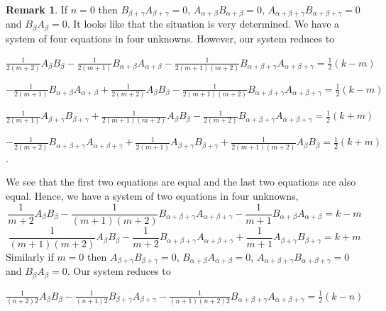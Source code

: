 \documentclass[twoside,a4paper,12pt]{article}
\theoremstyle{definition}
\newtheorem{remark}{Remark}
\newcommand{\ds}{\displaystyle}
\begin{document}
\begin{remark}\label{4to2}
	If $n=0$ then $B_{\beta+\gamma}A_{\beta+\gamma}=0$,
	$A_{\alpha+\beta}B_{\alpha+\beta}=0$,
	$A_{\alpha+\beta+\gamma}B_{\alpha+\beta+\gamma}=0$ and $B_\beta A_\beta=0$.
	It looks like that the situation is very determined. We have a system of
	four equations in four unknowns. However, our system reduces to
	\begin{flushleft}
		$\ds \frac1{2(m+2)}A_\beta B_\beta
		-\frac1{2(m+1)}B_{\alpha+\beta}A_{\alpha+\beta}-
		\frac1{2(m+1)(m+2)}
		B_{\alpha+\beta+\gamma}A_{\alpha+\beta+\gamma}=\frac12(k-m)$
	\end{flushleft}
	\begin{flushleft}
		$\ds -\frac1{2(m+1)}B_{\alpha+\beta}A_{\alpha+\beta}
		+\frac1{2(m+2)}A_\beta B_\beta-\frac1{2(m+1)(m+2)}
		B_{\alpha+\beta+\gamma}A_{\alpha+\beta+\gamma}=\frac12(k-m)$
	\end{flushleft}
	\begin{flushleft}
		$\ds \frac1{2(m+1)}A_{\beta+\gamma}B_{\beta+\gamma}
		+\frac1{2(m+1)(m+2)}A_\beta B_\beta-\frac1{2(m+2)}
		B_{\alpha+\beta+\gamma}A_{\alpha+\beta+\gamma}=\frac12(k+m)$
	\end{flushleft}
	\begin{flushleft}
		$\ds -\frac1{2(m+2)}B_{\alpha+\beta+\gamma}A_{\alpha+\beta+\gamma}
		+\frac1{2(m+1)}A_{\beta+\gamma}B_{\beta+\gamma}
			+\frac1{2(m+1)(m+2)}A_\beta B_\beta=\frac12(k+m)$.
	\end{flushleft}
	We see that the first two equations are equal and the last two equations
	are also equal. Hence, we have a system of two equations in four
	unknowns,
	\begin{equation*}
		\frac1{m+2}A_\beta B_\beta
		-\frac1{(m+1)(m+2)}B_{\alpha+\beta+\gamma}A_{\alpha+\beta+\gamma}
		-\frac1{m+1}B_{\alpha+\beta}A_{\alpha+\beta}=k-m
	\end{equation*}
	\begin{equation*}
		\frac1{(m+1)(m+2)}A_\beta B_\beta
		-\frac1{m+2}B_{\alpha+\beta+\gamma}A_{\alpha+\beta+\gamma}
		+\frac1{m+1}A_{\beta+\gamma}B_{\beta+\gamma}=k+m
	\end{equation*}
	Similarly if $m=0$ then $A_{\beta+\gamma}B_{\beta+\gamma}=0$,
	$B_{\alpha+\beta}A_{\alpha+\beta}=0$,
	$A_{\alpha+\beta+\gamma}B_{\alpha+\beta+\gamma}=0$ and $B_\beta A_\beta=0$.
	Our system reduces to
	\begin{flushleft}
		$\ds \frac1{(n+2)2}A_\beta B_\beta
			-\frac1{(n+1)2}B_{\beta+\gamma}A_{\beta+\gamma}-\frac1{(n+1)(n+2)2}
		B_{\alpha+\beta+\gamma}A_{\alpha+\beta+\gamma}=\frac12(k-n)$

\end{flushleft}
\end{remark}
\end{document}
